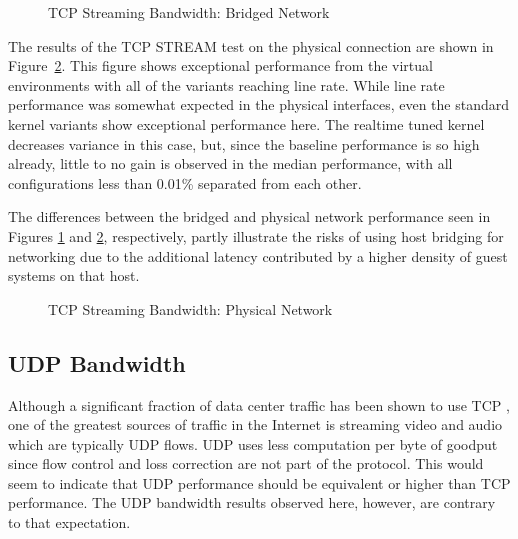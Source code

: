 \begin{figure}
    \centering
    \def\svgwidth{\columnwidth}
    
    \caption{TCP Streaming Bandwidth: Bridged Network}
    \label{fig:tcp_stream_bridge}
\end{figure}

The results of the TCP STREAM test on the physical connection are shown in Figure~\ref{fig:tcp_stream_phys}.
This figure shows exceptional performance from the virtual environments with all of the variants reaching line rate.
While line rate performance was somewhat expected in the physical interfaces, even the standard kernel variants show exceptional performance here.
The realtime tuned kernel decreases variance in this case, but, since the baseline performance is so high already, little to no gain is observed in the median performance, with all configurations less than 0.01\% separated from each other.  

The differences between the bridged and physical network performance seen in Figures \ref{fig:tcp_stream_bridge} and \ref{fig:tcp_stream_phys}, respectively, partly illustrate the risks of using host bridging for networking due to the additional latency contributed by a higher density of guest systems on that host.  

\begin{figure}
    \centering
    \def\svgwidth{\columnwidth}
    
    \caption{TCP Streaming Bandwidth: Physical Network}
    \label{fig:tcp_stream_phys}
\end{figure}

\subsection{UDP Bandwidth} %
\label{sub:udpbandwidth}
Although a significant fraction of data center traffic has been shown to use TCP \autocite{haTCPCloud2013}, one of the greatest sources of traffic in the Internet is streaming video and audio which are typically UDP flows.
UDP uses less computation per byte of goodput since flow control and loss correction are not part of the protocol.  
This would seem to indicate that UDP performance should be equivalent or higher than TCP performance.  
The UDP bandwidth results observed here, however, are contrary to that expectation.

